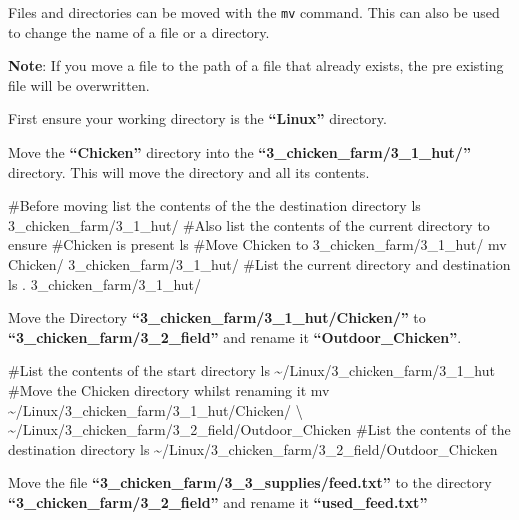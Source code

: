 \documentclass[
  letterpaper,
  DIV=11,
  numbers=noendperiod]{scrreprt}
\newenvironment{Shaded}{\begin{snugshade}}{\end{snugshade}}
\newcommand{\CommentTok}[1]{\textcolor[rgb]{0.37,0.37,0.37}{#1}}
\newcommand{\DataTypeTok}[1]{\textcolor[rgb]{0.68,0.00,0.00}{#1}}
\newcommand{\FunctionTok}[1]{\textcolor[rgb]{0.28,0.35,0.67}{#1}}
\newcommand{\NormalTok}[1]{\textcolor[rgb]{0.00,0.23,0.31}{#1}}
\begin{document}
Files and directories can be moved with the \texttt{mv} command. This
can also be used to change the name of a file or a directory.

\textbf{Note}: If you move a file to the path of a file that already
exists, the pre existing file will be overwritten.

First ensure your working directory is the \textbf{``Linux''} directory.

Move the \textbf{``Chicken''} directory into the
\textbf{``3\_chicken\_farm/3\_1\_hut/''} directory. This will move the
directory and all its contents.

\begin{Shaded}
\begin{Highlighting}[]
\CommentTok{\#Before moving list the contents of the the destination directory}
\FunctionTok{ls}\NormalTok{ 3\_chicken\_farm/3\_1\_hut/}
\CommentTok{\#Also list the contents of the current directory to ensure }
\CommentTok{\#Chicken is present}
\FunctionTok{ls}
\CommentTok{\#Move Chicken to 3\_chicken\_farm/3\_1\_hut/}
\FunctionTok{mv}\NormalTok{ Chicken/ 3\_chicken\_farm/3\_1\_hut/}
\CommentTok{\#List the current directory and destination}
\FunctionTok{ls}\NormalTok{ . 3\_chicken\_farm/3\_1\_hut/}
\end{Highlighting}
\end{Shaded}

Move the Directory \textbf{``3\_chicken\_farm/3\_1\_hut/Chicken/''} to
\textbf{``3\_chicken\_farm/3\_2\_field''} and rename it
\textbf{``Outdoor\_Chicken''}.

\begin{Shaded}
\begin{Highlighting}[]
\CommentTok{\#List the contents of the start directory}
\FunctionTok{ls}\NormalTok{ \textasciitilde{}/Linux/3\_chicken\_farm/3\_1\_hut}
\CommentTok{\#Move the Chicken directory whilst renaming it}
\FunctionTok{mv}\NormalTok{ \textasciitilde{}/Linux/3\_chicken\_farm/3\_1\_hut/Chicken/ }\DataTypeTok{\textbackslash{}}
\NormalTok{\textasciitilde{}/Linux/3\_chicken\_farm/3\_2\_field/Outdoor\_Chicken}
\CommentTok{\#List the contents of the destination directory}
\FunctionTok{ls}\NormalTok{ \textasciitilde{}/Linux/3\_chicken\_farm/3\_2\_field/Outdoor\_Chicken}
\end{Highlighting}
\end{Shaded}

Move the file \textbf{``3\_chicken\_farm/3\_3\_supplies/feed.txt''} to
the directory \textbf{``3\_chicken\_farm/3\_2\_field''} and rename it
\textbf{``used\_feed.txt''}
\end{document}
